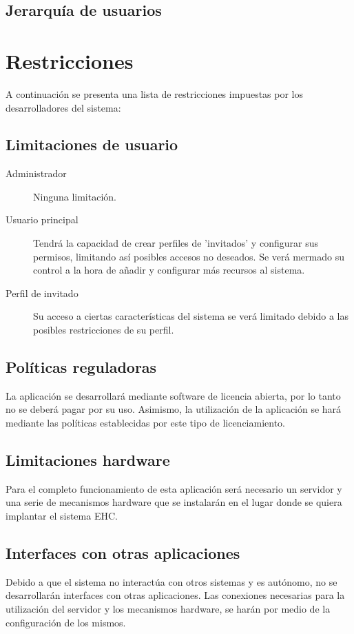 	\subsection{Jerarqu\'ia de usuarios}

\section{Restricciones}
	A continuaci\'on se presenta una lista de restricciones impuestas por los desarrolladores del sistema:
	
	\subsection{Limitaciones de usuario}
		\begin{description}
			\item[Administrador] Ninguna limitaci\'on.        
			
			\item[Usuario principal] Tendr\'a la capacidad de crear perfiles de 'invitados' y configurar sus permisos, limitando as\'i posibles accesos no deseados. Se ver\'a mermado su control a la hora de a\~nadir y configurar m\'as recursos al sistema.
			
			\item[Perfil de invitado] Su acceso a ciertas caracter\'isticas del sistema se ver\'a limitado debido a las posibles restricciones de su perfil.
		\end{description}
	
	\subsection{Pol\'iticas reguladoras}
		La aplicaci\'on se desarrollar\'a mediante software de licencia abierta, por lo tanto no se deber\'a pagar por su uso. Asimismo, la utilizaci\'on de la aplicaci\'on se har\'a mediante las pol\'iticas establecidas por este tipo de licenciamiento.
	
	\subsection{Limitaciones hardware}
		Para el completo funcionamiento de esta aplicaci\'on ser\'a necesario un servidor y una serie de mecanismos hardware que se instalar\'an en el lugar donde se quiera implantar el sistema EHC.
		
	\subsection{Interfaces con otras aplicaciones}
		Debido a que el sistema no interact\'ua con otros sistemas y es aut\'onomo, no se desarrollar\'an interfaces con otras aplicaciones. Las conexiones necesarias para la utilizaci\'on del servidor y los mecanismos hardware, se har\'an por medio de la configuraci\'on de los mismos.
		
